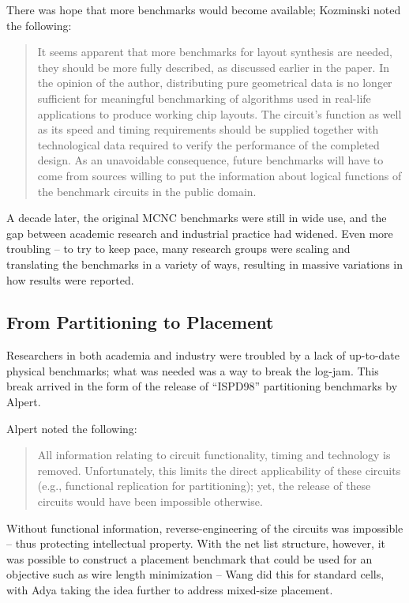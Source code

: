 \documentclass[sigconf]{acmart}
\begin{document}
There was hope that more benchmarks would
become available; Kozminski\cite{Kozminski91} noted the following:

\begin{quote}
It seems apparent that more benchmarks for layout synthesis are
needed, they should be more fully described, as discussed earlier in
the paper. In the opinion of the author, distributing pure
geometrical data is no longer sufficient for meaningful benchmarking
of algorithms used in real-life applications to produce working chip
layouts. The circuit's function as well as its speed and timing
requirements should be supplied together with technological data
required to verify the performance of the completed design. As an
unavoidable consequence, future benchmarks will have to come from
sources willing to put the information about logical functions of the
benchmark circuits in the public domain.
\end{quote}

A decade later, the original MCNC
benchmarks were still in wide use, and
the gap between academic research and
industrial practice had widened.
Even more troubling -- to try to keep pace, many research
groups were scaling and translating the benchmarks in
a variety of ways, resulting in massive variations in how
results were reported\cite{Madden010030}.

\subsection{From Partitioning to Placement}

Researchers in both academia and industry were troubled
by a lack of up-to-date physical benchmarks; what was
needed was a way to break the log-jam.
This break
arrived in the form of the release of ``ISPD98'' partitioning
benchmarks by Alpert\cite{Alpert980080}.

Alpert noted the following:
\begin{quote}
All information relating to circuit functionality, timing and
technology is removed. Unfortunately, this limits the direct
applicability of these circuits (e.g., functional replication for
partitioning); yet, the release of these circuits would have been
impossible otherwise. \cite{Alpert980080}
\end{quote}

Without functional information, reverse-engineering of the circuits
was impossible -- thus protecting intellectual property.
With the net list structure, however, it was possible to construct
a placement benchmark that could be used for an objective such
as wire length minimization -- Wang\cite{Wang000260} did this
for standard cells, with Adya\cite{Adya020012} taking the idea
further to address mixed-size placement.  
\end{document}
